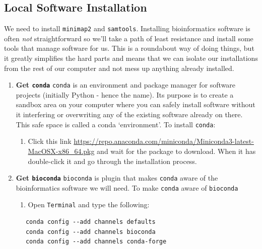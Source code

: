 \documentclass[]{book}
\providecommand{\tightlist}{%
  \setlength{\itemsep}{0pt}\setlength{\parskip}{0pt}}
\begin{document}
\hypertarget{local-software-installation}{%
\subsection{Local Software Installation}\label{local-software-installation}}

We need to install \texttt{minimap2} and \texttt{samtools}. Installing bioinformatics software is often \emph{not} straightforward so we'll take a path of least resistance and install some tools that manage software for us. This is a roundabout way of doing things, but it greatly simplifies the hard parts and means that we can isolate our installations from the rest of our computer and not mess up anything already installed.

\begin{enumerate}
\def\labelenumi{\arabic{enumi}.}
\tightlist
\item
  \textbf{Get \texttt{conda}}
  \texttt{conda} is an environment and package manager for software projects (initially Python - hence the name). Its purpose is to create a sandbox area on your computer where you can safely install software without it interfering or overwriting any of the existing software already on there. This safe space is called a conda `environment'. To install \texttt{conda}:

  \begin{enumerate}
  \def\labelenumii{\arabic{enumii}.}
  \tightlist
  \item
    Click this link \url{https://repo.anaconda.com/miniconda/Miniconda3-latest-MacOSX-x86_64.pkg} and wait for the package to download. When it has double-click it and go through the installation process.
  \end{enumerate}
\item
  \textbf{Get \texttt{bioconda}}
  \texttt{bioconda} is plugin that makes \texttt{conda} aware of the bioinformatics software we will need. To make \texttt{conda} aware of \texttt{bioconda}

  \begin{enumerate}
  \def\labelenumii{\arabic{enumii}.}
  \tightlist
  \item
    Open \texttt{Terminal} and type the following:
  \end{enumerate}
\end{enumerate}

\begin{verbatim}
      conda config --add channels defaults
      conda config --add channels bioconda
      conda config --add channels conda-forge
\end{verbatim}
\end{document}
